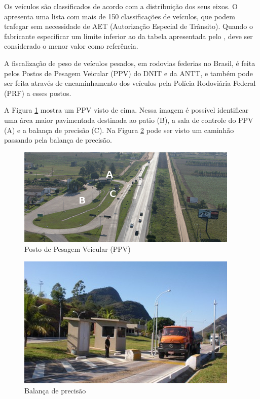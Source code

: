 \documentclass{ufscThesis}
\begin{document}
Os veículos são classificados de acordo com a distribuição dos seus eixos. O  apresenta uma lista com mais de 150 classificações de veículos, que podem trafegar sem necessidade de AET (Autorização Especial de Trânsito). Quando o fabricante especificar um limite inferior ao da tabela apresentada pelo , deve ser considerado o menor valor como referência.

A fiscalização de peso de veículos pesados, em rodovias federias no Brasil, é feita pelos Postos de Pesagem Veicular (PPV) do DNIT e da ANTT, e também pode ser feita através de encaminhamento dos veículos pela Polícia Rodoviária Federal (PRF) a esses postos.

A Figura \ref{fig:ppv} mostra um PPV visto de cima. Nessa imagem é possível identificar uma área maior pavimentada destinada ao patio (B), a sala de controle do PPV (A) e a balança de precisão (C). Na Figura \ref{fig:balanca-precisao} pode ser visto um caminhão passando pela balança de precisão.

\begin{figure}[h!]
  \caption{Posto de Pesagem Veicular (PPV)}
  \label{fig:ppv}
  \centering
    \includegraphics[scale=0.7]{./figuras/ppv_aerea_id.png}
\end{figure}

\begin{figure}[h!]
  \caption{Balança de precisão}
  \label{fig:balanca-precisao}
  \centering
    \includegraphics[scale=0.7]{./figuras/balanca-de-precisao.jpg}
\end{figure}
\end{document}

